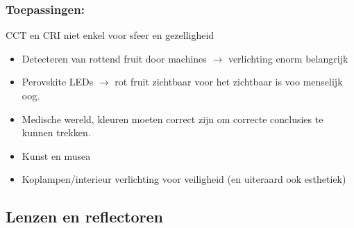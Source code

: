 \documentclass[12pt]{article}
\begin{document}
\subsubsection{Toepassingen:}
CCT en CRI niet enkel voor sfeer en gezelligheid\begin{itemize}
    \item Detecteren van rottend fruit door machines $\rightarrow$ verlichting enorm belangrijk
    \item Perovskite LEDs $\rightarrow$ rot fruit zichtbaar voor het zichtbaar is voo menselijk oog.
    \item Medische wereld, kleuren moeten correct zijn om correcte conclusies te kunnen trekken.
    \item Kunst en musea
    \item Koplampen/interieur verlichting voor veiligheid (en uiteraard ook esthetiek)
\end{itemize}
\subsection{Lenzen en reflectoren}
\end{document}
